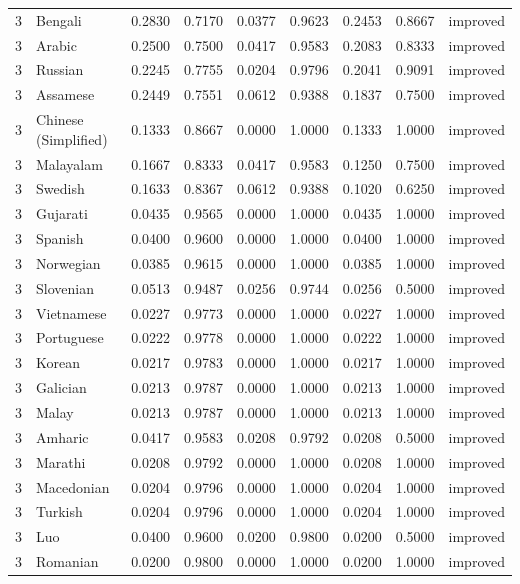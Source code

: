 \begin{tabular}{rlrrrrrrl}
3 & Bengali & 0.2830 & 0.7170 & 0.0377 & 0.9623 & 0.2453 & 0.8667 & improved \\
3 & Arabic & 0.2500 & 0.7500 & 0.0417 & 0.9583 & 0.2083 & 0.8333 & improved \\
3 & Russian & 0.2245 & 0.7755 & 0.0204 & 0.9796 & 0.2041 & 0.9091 & improved \\
3 & Assamese & 0.2449 & 0.7551 & 0.0612 & 0.9388 & 0.1837 & 0.7500 & improved \\
3 & Chinese (Simplified) & 0.1333 & 0.8667 & 0.0000 & 1.0000 & 0.1333 & 1.0000 & improved \\
3 & Malayalam & 0.1667 & 0.8333 & 0.0417 & 0.9583 & 0.1250 & 0.7500 & improved \\
3 & Swedish & 0.1633 & 0.8367 & 0.0612 & 0.9388 & 0.1020 & 0.6250 & improved \\
3 & Gujarati & 0.0435 & 0.9565 & 0.0000 & 1.0000 & 0.0435 & 1.0000 & improved \\
3 & Spanish & 0.0400 & 0.9600 & 0.0000 & 1.0000 & 0.0400 & 1.0000 & improved \\
3 & Norwegian & 0.0385 & 0.9615 & 0.0000 & 1.0000 & 0.0385 & 1.0000 & improved \\
3 & Slovenian & 0.0513 & 0.9487 & 0.0256 & 0.9744 & 0.0256 & 0.5000 & improved \\
3 & Vietnamese & 0.0227 & 0.9773 & 0.0000 & 1.0000 & 0.0227 & 1.0000 & improved \\
3 & Portuguese & 0.0222 & 0.9778 & 0.0000 & 1.0000 & 0.0222 & 1.0000 & improved \\
3 & Korean & 0.0217 & 0.9783 & 0.0000 & 1.0000 & 0.0217 & 1.0000 & improved \\
3 & Galician & 0.0213 & 0.9787 & 0.0000 & 1.0000 & 0.0213 & 1.0000 & improved \\
3 & Malay & 0.0213 & 0.9787 & 0.0000 & 1.0000 & 0.0213 & 1.0000 & improved \\
3 & Amharic & 0.0417 & 0.9583 & 0.0208 & 0.9792 & 0.0208 & 0.5000 & improved \\
3 & Marathi & 0.0208 & 0.9792 & 0.0000 & 1.0000 & 0.0208 & 1.0000 & improved \\
3 & Macedonian & 0.0204 & 0.9796 & 0.0000 & 1.0000 & 0.0204 & 1.0000 & improved \\
3 & Turkish & 0.0204 & 0.9796 & 0.0000 & 1.0000 & 0.0204 & 1.0000 & improved \\
3 & Luo & 0.0400 & 0.9600 & 0.0200 & 0.9800 & 0.0200 & 0.5000 & improved \\
3 & Romanian & 0.0200 & 0.9800 & 0.0000 & 1.0000 & 0.0200 & 1.0000 & improved \\

\end{tabular}
